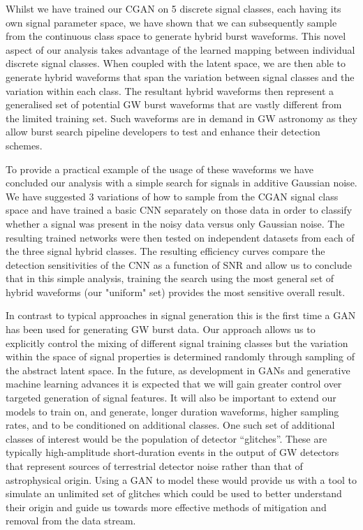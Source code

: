 \documentclass[12pt]{iopart}
\begin{document}
%
Whilst we have trained our \ac{CGAN} on 5 discrete signal classes, each having its own signal parameter space, we have shown that we can subsequently sample from the continuous class space to generate hybrid burst waveforms. This novel aspect of our analysis takes advantage of the learned mapping between individual discrete signal classes. When coupled with the latent space, we are then able to generate hybrid waveforms that span the variation between signal classes and the variation within each class. The resultant hybrid waveforms then represent a generalised set of potential GW burst waveforms that are vastly different from the limited training set. Such waveforms are in demand in GW astronomy as they allow burst search pipeline developers to test and enhance their detection schemes.    

%
To provide a practical example of the usage of these waveforms we have concluded our analysis with a simple search for signals in additive Gaussian noise. We have suggested 3 variations of how to sample from the \ac{CGAN} signal class space and have trained a basic \ac{CNN} separately on those data in order to classify whether a signal was present in the noisy data versus only Gaussian noise. The resulting trained networks were then tested on independent datasets from each of the three signal hybrid classes. The resulting efficiency curves compare the detection sensitivities of the \ac{CNN} as a function of \ac{SNR} and allow us to conclude that in this simple analysis, training the search using the most general set of hybrid waveforms (our "uniform" set) provides the most sensitive overall result. 

%
In contrast to typical approaches in signal generation this is the first time a \ac{GAN} has been used for generating GW burst data. Our approach allows us to explicitly control the mixing of different signal training classes but the variation within the space of signal properties is determined randomly through sampling of the abstract latent space. In the future, as development in \acp{GAN} and generative machine learning advances it is expected that we will gain greater control over targeted generation of signal features. It will also be important to extend our models to train on, and generate, longer duration waveforms, higher sampling rates, and to be conditioned on additional classes. One such set of additional classes of interest would be the population of detector ``glitches''. These are typically high-amplitude short-duration events in the output of GW detectors that represent sources of terrestrial detector noise rather than that of astrophysical origin. Using a \ac{GAN} to model these would provide us with a tool to simulate an unlimited set of glitches which could be used to better understand their origin and guide us towards more effective methods of mitigation and removal from the data stream. 
\end{document}
